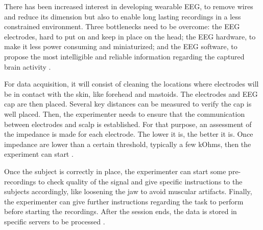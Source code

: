 \documentclass[../../../main.tex]{subfiles}
\begin{document}
There has been increased interest in developing wearable EEG, to remove wires and reduce its dimension but also to enable long lasting recordings in a less constrained environment. Three bottlenecks need to be overcome: the EEG electrodes, hard to put on and keep in place on the head; the EEG hardware, to make it less power consuming and miniaturized; and the EEG software, to propose the most intelligible and reliable information regarding the captured brain activity \cite{Corsi2023}.

For data acquisition, it will consist of cleaning the locations where electrodes will be in contact with the skin, like forehead and mastoids. The electrodes and EEG cap are then placed. Several key distances can be measured to verify the cap is well placed. Then, the experimenter needs to ensure that the communication between electrodes and scalp is established. For that purpose, an assessment of the impedance is made for each electrode. The lower it is, the better it is. Once impedance are lower than a certain threshold, typically a few kOhms, then the experiment can start \cite{Corsi2023}.

Once the subject is correctly in place, the experimenter can start some pre-recordings to check quality of the signal and give specific instructions to the subjects accordingly, like loosening the jaw to avoid muscular artifacts. Finally, the experimenter can give further instructions regarding the task to perform before starting the recordings. After the session ends, the data is stored in specific servers to be processed \cite{Corsi2023}.
\end{document}
